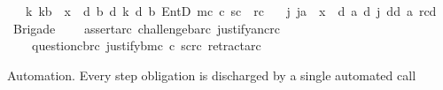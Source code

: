 \begin{isabellebody}
\ \ {\isasymor}\ {\isacharparenleft}{\kern0pt}{\isasymexists}k{\isachardot}{\kern0pt}\ k{\isasymnoteq}b\ {\isasymand}\ x\ {\isacharequal}{\kern0pt}\ {\isasymD}\isactrlsup d\ b\ {\isacharparenleft}{\kern0pt}{\isasymB}\isactrlsup d\ k\ {\isacharparenleft}{\kern0pt}{\isasymB}\isactrlsup d\ b\ {\isacharparenleft}{\kern0pt}EntD\ {\isacharparenleft}{\kern0pt}m\isactrlsup c\ {\isasymand}\isactrlsup c\ s\isactrlsup c{\isacharparenright}{\kern0pt}\ {\isasymominus}\ {\isacharparenleft}{\kern0pt}r\isactrlsup c{\isacharparenright}{\kern0pt}{\isacharparenright}{\kern0pt}{\isacharparenright}{\kern0pt}{\isacharparenright}{\kern0pt}{\isacharparenright}{\kern0pt}\isanewline
\ \ {\isasymor}\ {\isacharparenleft}{\kern0pt}{\isasymexists}j{\isachardot}{\kern0pt}\ j{\isasymnoteq}a\ {\isasymand}\ x\ {\isacharequal}{\kern0pt}\ {\isasymD}\isactrlsup d\ a\ {\isacharparenleft}{\kern0pt}{\isasymB}\isactrlsup d\ j\ {\isacharparenleft}{\kern0pt}{\isasymnot}\isactrlsup d{\isacharparenleft}{\kern0pt}{\isasymB}\isactrlsup d\ a\ {\isacharbraceleft}{\kern0pt}r\isactrlsup c{\isacharbraceright}{\kern0pt}\isactrlsup d{\isacharparenright}{\kern0pt}{\isacharparenright}{\kern0pt}{\isacharparenright}{\kern0pt}{\isacharparenright}{\kern0pt}{\isachardoublequoteclose}\isanewline
\isanewline
{}\isamarkupfalse%
\ {\isachardoublequoteopen}Brigade\ {\isasymequiv}\isanewline
\ \ {\isacharbrackleft}{\kern0pt}\ assert{\isacharbrackleft}{\kern0pt}a{\isacharcomma}{\kern0pt}r\isactrlsup c{\isacharbrackright}{\kern0pt}{\isacharcomma}{\kern0pt}\ challenge{\isacharbrackleft}{\kern0pt}b{\isacharcomma}{\kern0pt}a{\isacharcomma}{\kern0pt}r\isactrlsup c{\isacharbrackright}{\kern0pt}{\isacharcomma}{\kern0pt}\ justify{\isacharbrackleft}{\kern0pt}a{\isacharcomma}{\kern0pt}n\isactrlsup c{\isasymturnstile}\isactrlsup {\isasymoplus}r\isactrlsup c{\isacharbrackright}{\kern0pt}{\isacharcomma}{\kern0pt}\isanewline
\ \ \ \ question{\isacharbrackleft}{\kern0pt}c{\isacharcomma}{\kern0pt}b{\isacharcomma}{\kern0pt}r\isactrlsup c{\isacharbrackright}{\kern0pt}{\isacharcomma}{\kern0pt}\ justify{\isacharbrackleft}{\kern0pt}b{\isacharcomma}{\kern0pt}m\isactrlsup c\ {\isasymand}\isactrlsup c\ s\isactrlsup c{\isasymturnstile}\isactrlsup {\isasymominus}r\isactrlsup c{\isacharbrackright}{\kern0pt}{\isacharcomma}{\kern0pt}\ retract{\isacharbrackleft}{\kern0pt}a{\isacharcomma}{\kern0pt}r\isactrlsup c{\isacharcomma}{\kern0pt}{\isasymoplus}{\isacharbrackright}{\kern0pt}\ {\isacharbrackright}{\kern0pt}{\isachardoublequoteclose}%
\begin{isamarkuptext}%
Automation. Every step obligation is discharged by a single automated call

\end{isamarkuptext}
\end{isabellebody}
